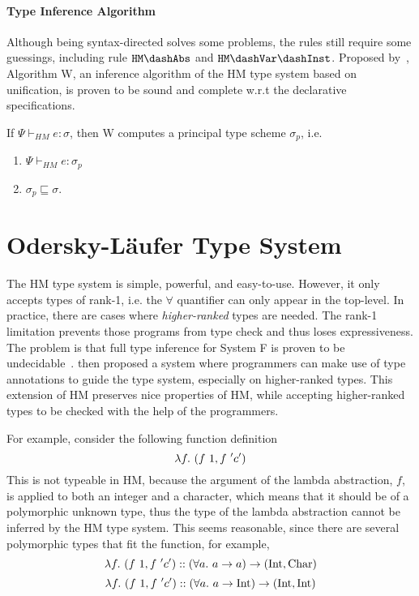 \paragraph{Type Inference Algorithm}
Although being syntax-directed solves some problems, the rules still require some guessings,
including rule $\mathtt{HM \dash Abs}$ and $\mathtt{HM \dash Var \dash Inst}$.
Proposed by~\citet{milner1978theory},
Algorithm W,
an inference algorithm of the HM type system based on unification,
is proven to be sound and complete w.r.t the declarative specifications.

\begin{theorem}
    If $\Psi \vdash_{HM} e : \sigma$, then W computes a principal type scheme $\sigma_p$, i.e.
    \begin{enumerate}
        \item $\Psi \vdash_{HM} e : \sigma_p$
        \item $\sigma_p \sqsubseteq \sigma$.
    \end{enumerate}
\end{theorem}




\section{Odersky-L\"aufer Type System}\label{sec:bg:ol}

The HM type system is simple, powerful, and easy-to-use.
However, it only accepts types of rank-1, i.e. the $\forall$
quantifier can only appear in the top-level.
In practice, there are cases where \emph{higher-ranked} types are needed.
The rank-1 limitation prevents those programs from type check
and thus loses expressiveness.
The problem is that full type inference for System F
is proven to be undecidable~\citep{wells1999typability}.
\citet{odersky1996putting} then proposed a system where programmers can
make use of type annotations to guide the type system,
especially on higher-ranked types.
This extension of HM preserves nice properties of HM,
while accepting higher-ranked types to be checked with the help of the programmers.

For example, consider the following function definition
$$\lam[f] (f~1, f~'c')$$
This is not typeable in HM, because the argument of the lambda abstraction, $f$,
is applied to both an integer and a character,
which means that it should be of a polymorphic unknown type,
thus the type of the lambda abstraction cannot be inferred by the HM type system.
This seems reasonable, since there are several polymorphic types that fit the function,
for example,
$$\lam[f] (f~1, f~'c') :: (\all a \to a) \to (\text{Int}, \text{Char})$$
$$\lam[f] (f~1, f~'c') :: (\all a \to \text{Int}) \to (\text{Int}, \text{Int})$$

